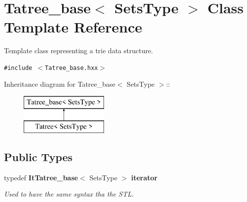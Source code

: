 \section{Tatree\_\-base$<$ Sets\-Type $>$ Class Template Reference}
\label{class_tatree__base}
Template class representing a trie data structure.  


{\tt \#include $<$Tatree\_\-base.hxx$>$}

Inheritance diagram for Tatree\_\-base$<$ Sets\-Type $>$::\begin{figure}[H]
\begin{center}
\leavevmode
\includegraphics[height=2cm]{class_tatree__base}
\end{center}
\end{figure}
\subsection*{Public Types}
\begin{CompactItemize}
\item 
typedef {\bf It\-Tatree\_\-base}$<$ Sets\-Type $>$ {\bf iterator}\label{class_tatree__base_6f81c0610c9b60a3067eacc19fbe0190}

\begin{CompactList}\small\item\em Used to have the same syntax tha the STL. \item\end{CompactList}\end{CompactItemize}
